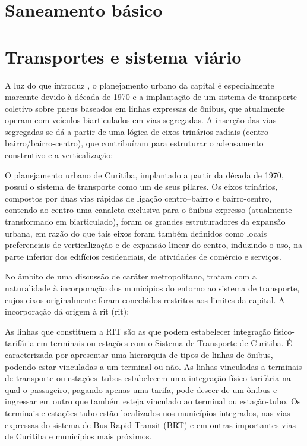 	\section{Saneamento básico}
	
	\section{Transportes e sistema viário}
	
	A luz do que introduz , o planejamento urbano da capital é especialmente marcante devido à década de 1970 e a implantação de um sistema de transporte coletivo sobre pneus baseados em linhas expressas de ônibus, que atualmente operam com veículos biarticulados em vias segregadas. A inserção das vias segregadas se dá a partir de uma lógica de eixos trinários radiais (centro-bairro/bairro-centro), que contribuíram para estruturar o adensamento construtivo e a verticalização:
	
	\begin{citacao}
		O planejamento urbano de Curitiba, implantado a partir da década de 1970, possui o sistema de transporte como um de seus pilares. Os eixos trinários, compostos por duas vias rápidas de ligação centro--bairro e bairro-centro, contendo ao centro uma canaleta exclusiva para o ônibus expresso (atualmente transformado em biarticulado), foram os grandes estruturadores da expansão urbana, em razão do que tais eixos foram também definidos como locais preferenciais de verticalização e de expansão linear do centro, induzindo o uso, na parte inferior dos edifícios residenciais, de atividades de comércio e serviços.
	\end{citacao}

	No âmbito de uma discussão de caráter metropolitano,  tratam com a naturalidade à incorporação dos municípios do entorno ao sistema de transporte, cujos eixos originalmente foram concebidos restritos aos limites da capital. A incorporação dá origem à \glsdesc{rit} (\gls{rit}):
	
	\begin{citacao}
		As linhas que constituem a RIT são as que podem estabelecer integração físico-tarifária em terminais ou estações com o Sistema de Transporte de Curitiba. É caracterizada por apresentar uma hierarquia de tipos de linhas de ônibus, podendo estar vinculadas a um terminal ou não. As linhas vinculadas a terminais de transporte ou estações--tubos estabelecem uma integração físico-tarifária na qual o passageiro, pagando apenas uma tarifa, pode descer de um ônibus e ingressar em outro que também esteja vinculado ao terminal ou estação-tubo. Os terminais e estações-tubo estão localizados nos municípios integrados, nas vias expressas do sistema de Bus Rapid Transit (BRT) e em outras importantes vias de Curitiba e municípios mais próximos. \cite[p. 376]{paese2014a}
	\end{citacao}
	
